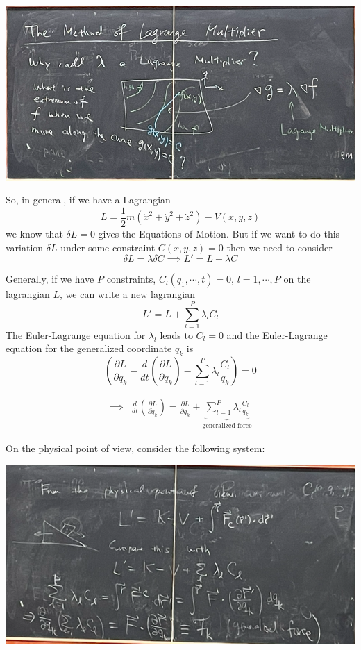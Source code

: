 \documentclass[11pt]{article}
\begin{document}
\begin{center}
  \includegraphics[scale=0.5]{July 3/july 3 pic 3 why do we call them lagrange multipliers.png}
\end{center}

So, in general, if we have a Lagrangian 
\[ L = \frac{1}{2}m \left(\dot{x}^2 + \dot{y}^2 + \dot{z}^2\right) - V(x,y,z) \]
we know that $\delta L = 0$ gives the Equations of Motion. But if we want to do this variation $\delta L$ under some constraint $C(x,y,z) = 0$ then we need to consider 
\[ \delta L = \lambda \delta C \implies L' = L - \lambda C \]


\vskip 0.5cm
\begin{redbox}
  Generally, if we have $P$ constraints, $C_{l}(q_1, \cdots, t) = 0$, $l = 1, \cdots, P$ on the lagrangian $L$, we can write a new lagrangian 
  \[ L' = L + \sum_{l = 1}^{P} \lambda_l C_l \]
  The Euler-Lagrange equation for $\lambda_l$ leads to $C_l = 0$ and the Euler-Lagrange equation for the generalized coordinate $q_k$ is 
  \[ \left( \frac{\partial L }{\partial q_{k}} - \frac{d}{dt} \left( \frac{\partial L}{\partial \dot{q}_{k}} \right) - \sum_{l = 1}^{P} \lambda_l \frac{C_l}{q_k} \right) = 0 \] 

  \begin{align*}
    \implies& \frac{d}{dt} \left( \frac{\partial L}{\partial \dot{q}_{k}} \right) = \frac{\partial L }{\partial q_{k}} + \underbrace{\sum_{l = 1}^{P} \lambda_l \frac{C_l}{q_k} }_{\text{generalized force}}
  \end{align*}
\end{redbox}

On the physical point of view, consider the following system:

\vskip 0.5cm
\begin{center}
  \includegraphics[scale=0.6]{July 3/july 3 pic 4 generalized force.png}
\end{center}
\vskip 0.5cm
\end{document}
